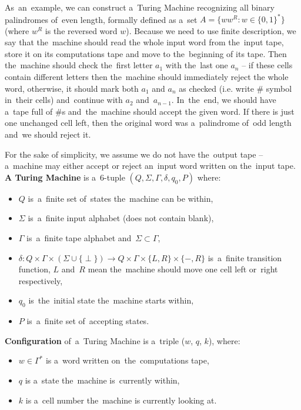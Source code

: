\documentclass[english,shortabstract,mgr]{iithesis}
\begin{document}
As~an~example, we can construct a~Turing Machine recognizing all binary palindromes of~even length,
formally defined as a~set $A = \{ ww^R : w \in \{0,1\}^* \}$ (where $w^R$ is the reversed word $w$).
Because we need to use finite description, we say that the~machine should read the whole input word
from the~input tape, store it on its computations tape and move to the~beginning of its tape.
Then the~machine should check the~first letter $a_1$ with the~last one $a_n$ -- if these cells
contain different letters then the~machine should immediately reject the whole word,
otherwise, it should mark both $a_1$ and $a_n$ as checked (i.e. write $\#$ symbol in~their cells)
and~continue with $a_2$ and~$a_{n-1}$. In~the~end, we should have a~tape full of $\#$s and~the~machine
should accept the given word. If there is just one unchanged cell left, then the original word was a~palindrome
of~odd length and~we should reject it.

For the sake of simplicity, we assume we do not have the~output tape -- a~machine may either accept or reject
an~input word written on the~input tape. \textbf{A Turing Machine} is a~$6$-tuple
$(Q,\Sigma,\Gamma,\delta,q_0,P)$ where:
\begin{itemize}
  \item $Q$ is~a~finite set of~states the~machine can be within,
  \item $\Sigma$ is~a~finite input alphabet (does not contain blank),
  \item $\Gamma$ is~a~finite tape alphabet and~$\Sigma \subset \Gamma$,
  \item $\delta: Q \times \Gamma \times \left( \Sigma \cup \{\perp\} \right)
      \rightarrow Q \times \Gamma \times \{L,R\} \times \{-,R\}$  is~a~finite
      transition function, $L$ and~$R$ mean the~machine should move one cell
      left or~right respectively,
  \item $q_0$ is~the~initial state the~machine starts within,
  \item $P$ is~a~finite set of~accepting states.
\end{itemize}

\textbf{Configuration} of~a~Turing Machine is a~triple ($w$, $q$, $k$), where:
\begin{itemize}
  \item $w \in \Gamma^*$ is a~word written on~the~computations tape,
  \item $q$ is a~state the~machine is~currently within,
  \item $k$ is a~cell number the~machine is currently looking at.
\end{itemize}
\end{document}
